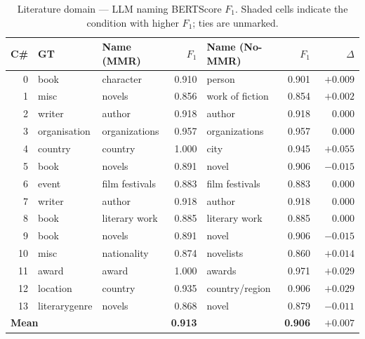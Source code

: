 \documentclass[11pt,a4paper]{article}
\begin{document}
\begin{table}[h]
\centering
\caption{Literature domain --- LLM naming BERTScore $F_1$.
\colorbox{mmrcolor}{Shaded} cells indicate the condition with higher $F_1$; ties are unmarked.}
\label{tab:lit}
\small
\setlength{\tabcolsep}{4pt}
\begin{tabular}{r l l r l r r}
\toprule
\textbf{C\#} & \textbf{GT} &
  \textbf{Name (MMR)} & \textbf{$F_1$} &
  \textbf{Name (No-MMR)} & \textbf{$F_1$} &
  \textbf{$\Delta$} \\
\midrule
0  & book         & character    & \cellcolor{yellow!25}0.910 & person          & \cellcolor{yellow!25}0.901 & $+0.009$ \\
1  & misc         & novels       & \cellcolor{red!15}0.856  & work of fiction  & \cellcolor{red!15}0.854  & $+0.002$ \\
2  & writer       & author       & \cellcolor{yellow!25}0.918 & author          & \cellcolor{yellow!25}0.918 & $\phantom{+}0.000$ \\
3  & organisation & organizations & \cellcolor{yellow!25}0.957 & organizations  & \cellcolor{yellow!25}0.957 & $\phantom{+}0.000$ \\
4  & country      & country      & \cellcolor{green!15}1.000 & city             & \cellcolor{yellow!25}0.945 & $+0.055$ \\
5  & book         & novels       & \cellcolor{red!15}0.891  & novel            & \cellcolor{yellow!25}0.906 & $-0.015$ \\
6  & event        & film festivals & \cellcolor{red!15}0.883 & film festivals  & \cellcolor{red!15}0.883  & $\phantom{+}0.000$ \\
7  & writer       & author       & \cellcolor{yellow!25}0.918 & author          & \cellcolor{yellow!25}0.918 & $\phantom{+}0.000$ \\
8  & book         & literary work & \cellcolor{red!15}0.885 & literary work   & \cellcolor{red!15}0.885  & $\phantom{+}0.000$ \\
9  & book         & novels       & \cellcolor{red!15}0.891  & novel            & \cellcolor{yellow!25}0.906 & $-0.015$ \\
10 & misc         & nationality  & \cellcolor{red!15}0.874  & novelists        & \cellcolor{red!15}0.860  & $+0.014$ \\
11 & award        & award        & \cellcolor{green!15}1.000 & awards          & \cellcolor{yellow!25}0.971 & $+0.029$ \\
12 & location     & country      & \cellcolor{yellow!25}0.935 & country/region  & \cellcolor{yellow!25}0.906 & $+0.029$ \\
13 & literarygenre& novels       & \cellcolor{red!15}0.868  & novel            & \cellcolor{red!15}0.879  & $-0.011$ \\
\midrule
\multicolumn{2}{l}{\textbf{Mean}} &
  & \textbf{0.913} & & \textbf{0.906} & $+0.007$ \\
\bottomrule
\end{tabular}
\end{table}
\end{document}

